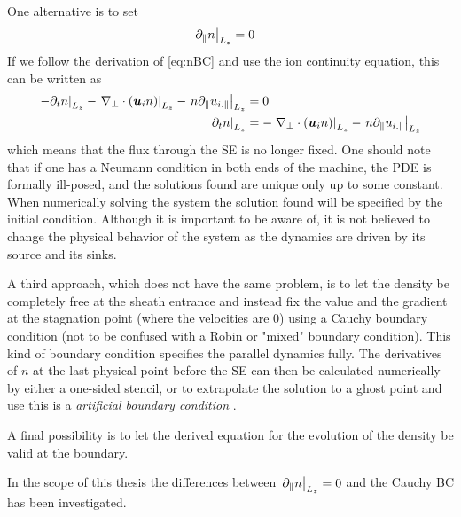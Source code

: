One alternative is to set
%
\begin{align*}
    \left. \partial_\| n \right|_{L_z} &= 0
\end{align*}
%
If we follow the derivation of \cref{eq:nBC} and use the ion continuity equation, this can be written as
%
\begin{align*}
    \left.- \partial_tn \right|_{L_z}- \left.\nabla_\perp\cdot\left(\boldsymbol{u}_{i} n \right)\right|_{L_z}
    -\left.n \partial_\| u_{i.\|}\right|_{L_z}
    &= 0\\
    \left.\partial_tn \right|_{L_z}&=  - \left.\nabla_\perp\cdot\left(\boldsymbol{u}_{i} n \right)\right|_{L_z}-
    \left.n \partial_\| u_{i.\|}\right|_{L_z}
\end{align*}
%
which means that the flux through the SE is no longer fixed.
One should note that if one has a Neumann condition in both ends of the machine, the PDE is formally ill-posed, and the solutions found are unique only up to some constant.
When numerically solving the system the solution found will be specified by the initial condition.
Although it is important to be aware of, it is not believed to change the physical behavior of the system as the dynamics are driven by its source and its sinks.

A third approach, which does not have the same problem, is to let the density be completely free at the sheath entrance and instead fix the value and the gradient at the stagnation point (where the velocities are $0$) using a Cauchy boundary condition (not to be confused with a Robin or "mixed" boundary condition).
This kind of boundary condition specifies the parallel dynamics fully.
The derivatives of $n$ at the last physical point before the SE can then be calculated numerically by either a one-sided stencil, or to extrapolate the solution to a ghost point and use this is a \emph{artificial boundary condition} \cite{Leveque2007book}.

A final possibility is to let the derived equation for the evolution of the density be valid at the boundary.

In the scope of this thesis the differences between $\left. \partial_\| n \right|_{L_z} = 0$ and the Cauchy BC has been investigated.


